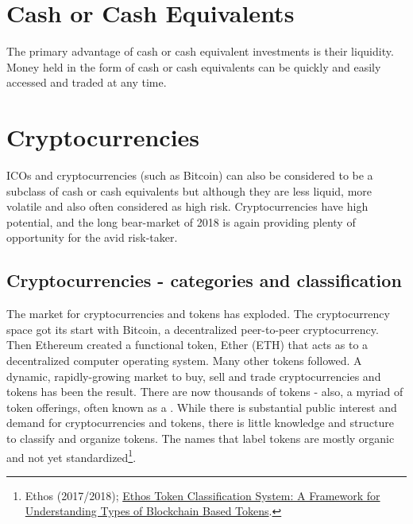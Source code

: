 \section{Cash or Cash Equivalents}
The primary advantage of cash or cash equivalent investments is their liquidity. Money held in the form of cash or cash equivalents can be quickly and easily accessed and traded at any time. 

\section{Cryptocurrencies}
ICOs and cryptocurrencies (such as Bitcoin) can also be considered to be a subclass of cash or cash equivalents but although they are less liquid, more volatile and also often considered as high risk. Cryptocurrencies have high potential, and the long bear-market of 2018 is again providing plenty of opportunity for the avid risk-taker.

\subsection{Cryptocurrencies - categories and classification}
The market for cryptocurrencies and tokens has exploded. The cryptocurrency space got its start with Bitcoin, a decentralized peer-to-peer cryptocurrency. Then Ethereum created a functional token, Ether (ETH) that acts as  to a decentralized computer
operating system. Many other tokens followed. A dynamic, rapidly-growing market to buy, sell and trade cryptocurrencies and tokens has been the result.
There are now thousands of tokens - also, a myriad of token offerings, often known as a . While there is substantial public interest and demand for cryptocurrencies and tokens, there is little knowledge and structure to classify and organize tokens. The names that label tokens are mostly organic and not yet standardized\footnote{Ethos (2017/2018); \href{https://www.ethos.io/blockchain-finance/}{Ethos Token Classification System: A Framework for Understanding Types of Blockchain Based Tokens}.}. 




